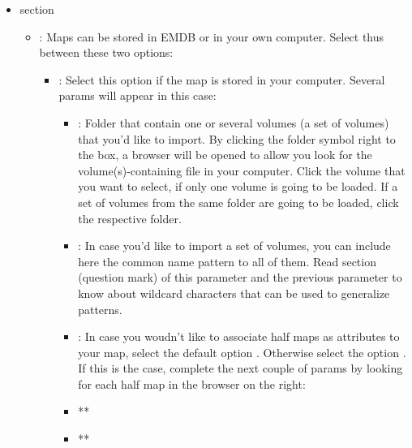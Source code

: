 \begin{itemize}
   \item {} section
  

        \begin{itemize}
        \item {}: Maps can be stored in EMDB or in your own computer. Select thus between these two options:
                    \begin{itemize}
                    \item {}: Select this option if the map is stored in your computer. Several params will appear in this case:\\
                                \begin{itemize}
                                \item {}: Folder that contain one or several volumes (a set of volumes) that you'd like to import. By clicking the folder symbol right to the  box, a browser will be opened to allow you look for the volume(s)-containing file in your computer. Click the volume that you want to select, if only one volume is going to be loaded. If a set of volumes from the same folder are going to be loaded, click the respective folder.
                                \item {}: In case you'd like to import a set of volumes, you can include here the common name pattern to all of them. Read  section (question mark) of this parameter and the previous parameter  to know about wildcard characters that can be used to generalize patterns.
                                \item {}: In case you woudn't like to associate half maps as attributes to your map, select the default option . Otherwise select the option . If this is the case, complete the next couple of params by looking for each half map in the browser on the right:
                                    
                                    \item ** 
                                    \item ** 
                                    

\end{itemize}
\end{itemize}
\end{itemize}
\end{itemize}
